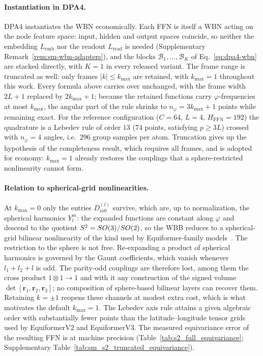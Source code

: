 \paragraph{Instantiation in DPA4.}
DPA4 instantiates the WBN economically.
Each FFN is itself a WBN acting on the node feature space: input, hidden and output spaces coincide, so neither the embedding $L_{\mathrm{emb}}$ nor the readout $L_{\mathrm{read}}$ is needed (Supplementary Remark~\ref{rem:sm-wbn-adapters}), and the blocks $\mathcal{B}_1,\dots,\mathcal{B}_K$ of Eq.~\eqref{eq:dpa4-wbn} are stacked directly, with $K=1$ in every released variant.
The frame range is truncated as well: only frames $|k|\le k_{\max}$ are retained, with $k_{\max}=1$ throughout this work.
Every formula above carries over unchanged, with the frame width $2L+1$ replaced by $2k_{\max}+1$; because the retained functions carry $\varphi$-frequencies at most $k_{\max}$, the angular part of the rule shrinks to $n_\varphi=3k_{\max}+1$ points while remaining exact.
For the reference configuration ($C=64$, $L=4$, $H_{\mathrm{FFN}}=192$) the quadrature is a Lebedev rule of order $13$ ($74$ points, satisfying $p\ge 3L$) crossed with $n_\varphi=4$ angles, i.e.\ $296$ group samples per atom.
Truncation gives up the hypothesis of the completeness result, which requires all frames, and is adopted for economy: $k_{\max}=1$ already restores the couplings that a sphere-restricted nonlinearity cannot form.

\paragraph{Relation to spherical-grid nonlinearities.}
At $k_{\max}=0$ only the entries $D^{(l)}_{m0}$ survive, which are, up to normalization, the spherical harmonics $Y_l^m$: the expanded functions are constant along $\varphi$ and descend to the quotient $S^2=SO(3)/SO(2)$, so the WBB reduces to a spherical-grid bilinear nonlinearity of the kind used by Equiformer-family models~\cite{liao2023equiformerv2,liao2026equiformerv3}.
The restriction to the sphere is not free.
Re-expanding a product of spherical harmonics is governed by the Gaunt coefficients, which vanish whenever $l_1+l_2+l$ is odd.
The parity-odd couplings are therefore lost, among them the cross product $1\otimes 1\to 1$ and with it any construction of the signed volume $\det[\mathbf{r}_1,\mathbf{r}_2,\mathbf{r}_3]$; no composition of sphere-based bilinear layers can recover them.
Retaining $k=\pm 1$ reopens these channels at modest extra cost, which is what motivates the default $k_{\max}=1$.
The Lebedev axis rule attains a given algebraic order with substantially fewer points than the latitude--longitude tensor grids used by EquiformerV2 and EquiformerV3.
The measured equivariance error of the resulting FFN is at machine precision (Table~\ref{tab:s2_full_equivariance}; Supplementary Table~\ref{tab:sm_s2_truncated_equivariance}).

